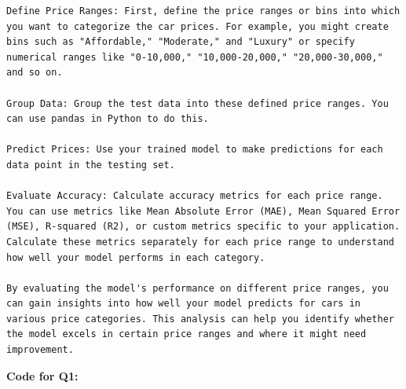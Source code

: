 \documentclass{article}
\begin{document}
\begin{titlepage}
\begin{verbatim}
Define Price Ranges: First, define the price ranges or bins into which you want to categorize the car prices. For example, you might create bins such as "Affordable," "Moderate," and "Luxury" or specify numerical ranges like "0-10,000," "10,000-20,000," "20,000-30,000," and so on.

Group Data: Group the test data into these defined price ranges. You can use pandas in Python to do this.

Predict Prices: Use your trained model to make predictions for each data point in the testing set.

Evaluate Accuracy: Calculate accuracy metrics for each price range. You can use metrics like Mean Absolute Error (MAE), Mean Squared Error (MSE), R-squared (R2), or custom metrics specific to your application. Calculate these metrics separately for each price range to understand how well your model performs in each category.

By evaluating the model's performance on different price ranges, you can gain insights into how well your model predicts for cars in various price categories. This analysis can help you identify whether the model excels in certain price ranges and where it might need improvement.
\end{verbatim}
\end{titlepage}
\textbf{Code for Q1:}
\end{document}
